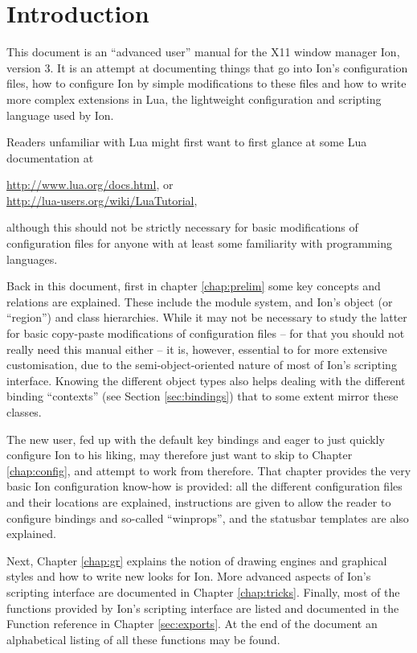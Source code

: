 
\chapter{Introduction}

This document is an ``advanced user'' manual for the X11 window manager
Ion, version 3. It is an attempt at documenting things that go into Ion's
configuration files, how to configure Ion by simple modifications 
to these files and how to write more complex extensions in Lua, the 
lightweight configuration and scripting language used by Ion. 

Readers unfamiliar with Lua might first want to first glance at some 
Lua documentation at

\begin{center}
    \url{http://www.lua.org/docs.html}, or \\
    \url{http://lua-users.org/wiki/LuaTutorial},
\end{center}

although this should not be strictly necessary for basic modifications
of configuration files for anyone with at least some familiarity with
programming languages.

Back in this document, first in chapter \ref{chap:prelim} some key
concepts and relations are explained. These include the module system,
and Ion's object (or ``region'') and class hierarchies. While it may
not be necessary to study the latter for basic copy-paste modifications
of configuration files -- for that you should not really need this
manual either -- it is, however, essential to for more extensive
customisation, due to the semi-object-oriented nature of most of
Ion's scripting interface. Knowing the different object types also
helps dealing with the different binding ``contexts'' (see
Section \ref{sec:bindings}) that to some extent mirror these classes.

The new user, fed up with the default key bindings and eager to 
just quickly configure Ion to his liking, may therefore just want
to skip to Chapter \ref{chap:config}, and attempt to work from therefore.
That chapter provides the very basic Ion configuration know-how
is provided: all the different configuration files and their locations
are explained, instructions are given to allow the reader to
configure bindings and so-called ``winprops'', and the statusbar
templates are also explained. 

Next, Chapter \ref{chap:gr} explains the notion of drawing engines
and graphical styles and how to write new looks for Ion. More advanced
aspects of Ion's scripting interface are documented in Chapter 
\ref{chap:tricks}. 
Finally, most of the functions provided by Ion's scripting interface
are listed and documented in the Function reference in Chapter
\ref{sec:exports}. At the end of the document an alphabetical
listing of all these functions may be found.


